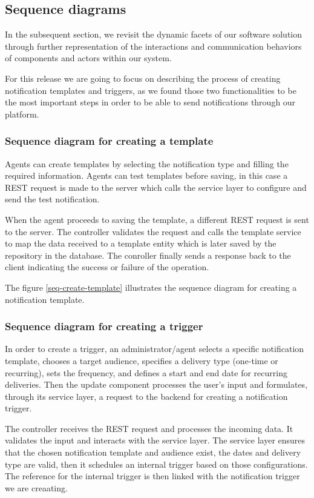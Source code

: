 \subsection{Sequence diagrams}
In the subsequent section, we revisit the dynamic facets of our software solution through further
representation of the interactions and communication behaviors of components and actors within our system.

For this release we are going to focus on describing the process of creating notification templates
and triggers, as we found those two functionalities to be the most important steps in
order to be able to send notifications through our platform.

\subsubsection{Sequence diagram for creating a template}
Agents can create templates by selecting the notification type and filling the required information. Agents
can test templates before saving, in this case a REST request is made to the server which calls the service
layer to configure and send the test notification.

When the agent proceeds to saving the template, a different REST request is sent to the server.
The controller validates the request and calls the template service to map the data received to a template
entity which is later saved by the repository in the database. The conroller finally sends a response back
to the client indicating the success or failure of the operation.

\noindent The figure \ref{seq-create-template} illustrates the sequence diagram for creating a notification template.

\subsubsection{Sequence diagram for creating a trigger}
In order to create a trigger, an administrator/agent selects a specific notification template, chooses a target
audience, specifies a delivery type (one-time or recurring), sets the frequency, and defines a start and end
date for recurring deliveries. Then the update component processes the user's input and formulates, through
its service layer, a request to the backend for creating a notification trigger.

The controller receives the REST request and processes the incoming data. It validates the input
and interacts with the service layer. The service layer ensures that the chosen notification template and
audience exist, the dates and delivery type are valid, then it schedules an internal trigger based on those
configurations. The reference for the internal trigger is then linked with the notification trigger we are
creaating.

